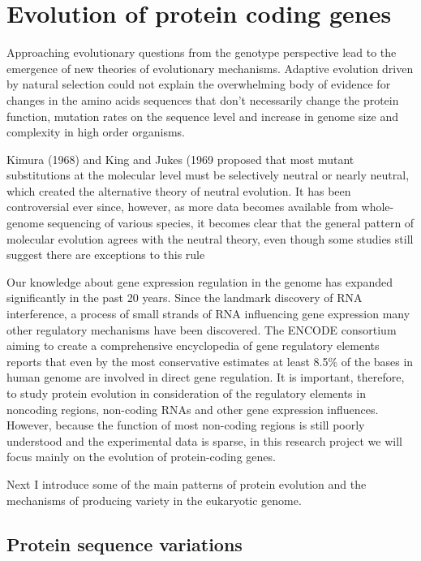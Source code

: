 \documentclass[11pt, a4paper,oneside]{report}
\begin{document}
\section{Evolution of protein coding genes}
 Approaching evolutionary questions from the genotype perspective lead to the emergence of new theories of evolutionary mechanisms. Adaptive evolution driven by natural selection could not explain the overwhelming body of evidence for changes in the amino acids sequences that don't necessarily change the protein function, mutation rates on the sequence level and increase in genome size and complexity in high order organisms. 
 
 Kimura (1968) and King and Jukes (1969 proposed that most mutant substitutions at the molecular level must be selectively neutral or nearly neutral, which created the alternative theory of neutral evolution\cite{Kimura1968,King1969}. It has been controversial ever since, however, as more data becomes available from whole-genome sequencing of various species, it becomes clear that the general pattern of molecular evolution agrees with the neutral theory, even though some studies still suggest there are exceptions to this rule\cite{Haygood2007,Nielsen2007,Akey2009}  

Our knowledge about gene expression regulation in the genome has expanded significantly in the past 20 years. Since the landmark discovery of RNA interference, a process of small strands of RNA influencing gene expression\cite{Fire1998} many other regulatory mechanisms have been discovered.  The ENCODE consortium aiming to create a comprehensive encyclopedia of gene regulatory elements reports that even by the most conservative estimates at least 8.5\% of the bases in human genome are involved in direct gene regulation\cite{Bernstein2012}.  It is important, therefore, to study protein evolution in consideration of the regulatory elements in noncoding regions, non-coding RNAs and other gene expression influences. However, because the function of most non-coding regions is still poorly understood and the experimental data is sparse, in this research project we will focus mainly on the evolution of protein-coding genes. 

Next I introduce some of the main patterns of protein evolution and the mechanisms of producing variety in the eukaryotic genome. 

\subsection{Protein sequence variations}
\end{document}
